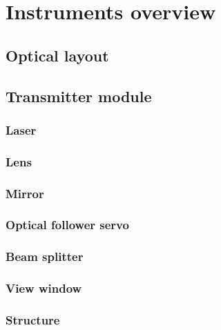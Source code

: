 
\chapter{Instruments overview} %

\label{Chapter3} %




\section{Optical layout }


\section{Transmitter module}

\subsection{Laser}
\subsection{Lens}
\subsection{Mirror}
\subsection{Optical follower servo}
\subsection{Beam splitter}
\subsection{View window}
\subsection{Structure}

